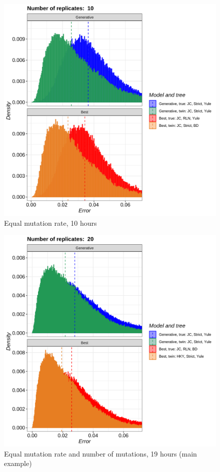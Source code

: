 \begin{figure}[H]
  \includegraphics[width=\textwidth]{pirouette_example_18/errors.png}
  \caption{Equal mutation rate, 10 hours}
\end{figure}

\begin{figure}[H]
  \includegraphics[width=\textwidth]{pirouette_example_28/errors.png}
  \caption{Equal mutation rate and number of mutations, 19 hours (main example)}
\end{figure}

